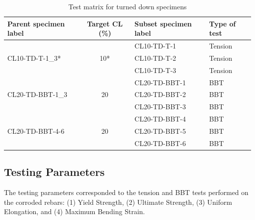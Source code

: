 \begin{table}[htbp]
\caption{Test matrix for turned down specimens}
\label{tab:turned_down_matrix}
\centering
\begin{tabular}{lcll}
Parent specimen label             & Target CL (\%)       & Subset specimen label & Type of test \\ \hline
\multirow{3}{*}{CL10-TD-T-1\_3*}  & \multirow{3}{*}{10*} & CL10-TD-T-1           & Tension      \\
                                  &                      & CL10-TD-T-2           & Tension      \\
                                  &                      & CL10-TD-T-3           & Tension      \\
\multirow{3}{*}{CL20-TD-BBT-1\_3} & \multirow{3}{*}{20}  & CL20-TD-BBT-1         & BBT          \\
                                  &                      & CL20-TD-BBT-2         & BBT          \\
                                  &                      & CL20-TD-BBT-3         & BBT          \\
\multirow{3}{*}{CL20-TD-BBT-4-6}  & \multirow{3}{*}{20}  & CL20-TD-BBT-4         & BBT          \\
                                  &                      & CL20-TD-BBT-5         & BBT          \\
                                  &                      & CL20-TD-BBT-6         & BBT         
\end{tabular}
\end{table}

\subsection{Testing Parameters}
The testing parameters corresponded to the tension and BBT tests performed on the corroded rebars: (1) Yield Strength, (2) Ultimate Strength, (3) Uniform Elongation, and (4) Maximum Bending Strain.

